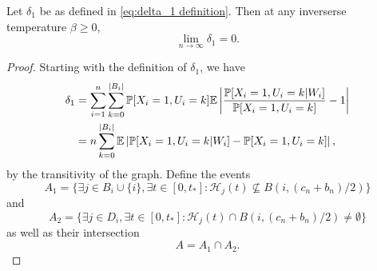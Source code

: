 		
	\begin{lemma}
	\label{lem:delta1 goes to 0 general}
		Let $\delta_1$ be as defined in \eqref{eq:delta_1 definition}. Then at any inverserse temperature $\beta \geq 0$,
		\begin{equation}
			\lim_{n\rightarrow\infty} \delta_1 = 0.
		\end{equation}
	\end{lemma}
	\begin{proof}
		Starting with the definition of $\delta_1$, we have
		\begin{align}
			\delta_1 &= \sum_{i = 1}^n \sum_{k = 0}^{|B_i|} \prob[X_i = 1, U_i = k] \expect \left| \frac{\prob[X_i = 1, U_i = k|W_i]}{\prob[X_i = 1, U_i = k]} - 1 \right|\\
			&= n \sum_{k = 0}^{|B_i|} \expect \left|\prob[X_i = 1, U_i = k|W_i] - \prob[X_i = 1, U_i = k] \right|,%
			\label{eq:nD delta1 line 2}
		\end{align}
		by the transitivity of the graph.
		Define the events
		\begin{equation}
			A_1 = \{\exists j \in B_i \cup \{i\}, \exists t \in [0, t_*] : \mathcal{H}_j(t) \nsubseteq  B(i, (c_n + b_n)/2)\}
		\end{equation}
		and
		\begin{equation}
			A_2 = \{\exists j \in D_i, \exists t \in [0, t_*] : \mathcal{H}_j(t) \cap B(i, (c_n + b_n)/2) \neq \emptyset\}
		\end{equation}
		as well as their intersection
		\begin{equation}
			A = A_1 \cap A_2.
		\end{equation}


\end{proof}
